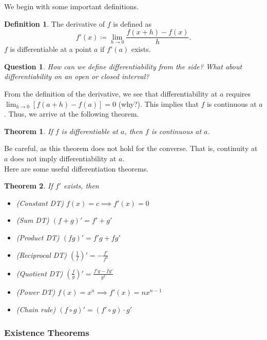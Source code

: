 \documentclass[11pt]{scrartcl}
\theoremstyle{plain}
\newtheorem{theorem}{Theorem}[section]
\newtheorem*{question}{Question}
\theoremstyle{definition}
\newtheorem*{definition}{Definition}
\theoremstyle{remark}
\begin{document}
We begin with some important definitions.

\begin{definition}
    The derivative of $f$ is defined as \[ f'(x)\coloneqq \lim_{ h \to 0 } \frac{{f(x+h)-f(x)}}{h}. \]
    $f$ is differentiable at a point $a$ if $f'(a)$ exists.
\end{definition}

\begin{question} 
    How can we define differentiability from the side? What about differentiability on an open or
    closed interval?
\end{question}

From the definition of the derivative, we see that differentiability at $a$ requires $\lim_{ h \to 0 } 
[f(a+h)-f(a)]=0$ (why?). This implies that $f$ is continuous at $a$. Thus, we arrive at the following theorem.

\begin{theorem}
    If $f$ is differentiable at $a$, then $f$ is continuous at $a$.
\end{theorem}

Be careful, as this theorem does not hold for the converse. That is, continuity at $a$ does not imply
differentiability at $a$. \\

Here are some useful differentiation theorems.

\begin{theorem}
    If $f'$ exists, then
    \begin{itemize}
        \item (Constant DT) $f(x)=c\implies f'(x)=0$
        \item (Sum DT) $(f+g)'=f'+g'$
        \item (Product DT) $(fg)'=f'g+fg'$
        \item (Reciprocal DT) $\left( \frac{1}{f} \right)'=-\frac{f'}{f^{2}}$
        \item (Quotient DT) $\left( \frac{f}{g} \right)'= \frac{{f'g-fg'}}{g^{2}}$
        \item (Power DT) $f(x)=x^n\implies f'(x)=nx^{n-1}$
        \item (Chain rule) $(f\circ g)'=(f'\circ g)\cdot g'$
    \end{itemize}
\end{theorem}

\subsubsection{Existence Theorems}
\end{document}

